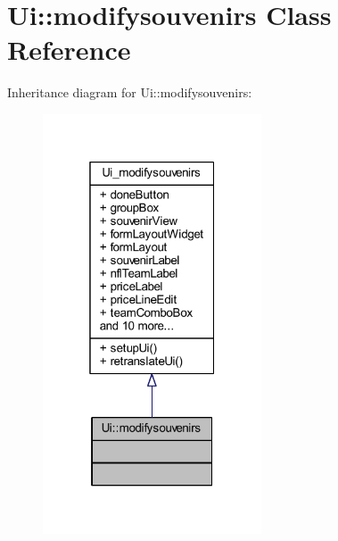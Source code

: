 \hypertarget{class_ui_1_1modifysouvenirs}{}\section{Ui\+:\+:modifysouvenirs Class Reference}
\label{class_ui_1_1modifysouvenirs}


Inheritance diagram for Ui\+:\+:modifysouvenirs\+:\nopagebreak
\begin{figure}[H]
\begin{center}
\leavevmode
\includegraphics[width=184pt]{class_ui_1_1modifysouvenirs__inherit__graph}
\end{center}
\end{figure}


